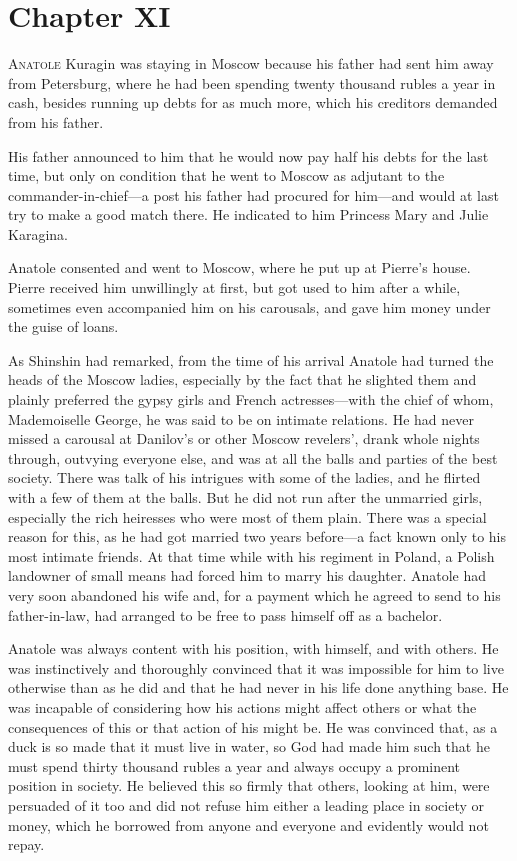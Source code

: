 \chapter*{Chapter XI}
\ifaudio     
{} 
\fi

\lettrine[lines=2, loversize=0.3, lraise=0]{\initfamily A}{natole}
Kuragin was staying in Moscow because his father had sent
him away from Petersburg, where he had been spending twenty
thousand rubles a year in cash, besides running up debts for as
much more, which his creditors demanded from his father.

His father announced to him that he would now pay half his debts
for the last time, but only on condition that he went to Moscow
as adjutant to the commander-in-chief---a post his father had
procured for him---and would at last try to make a good match
there. He indicated to him Princess Mary and Julie Karagina.

Anatole consented and went to Moscow, where he put up at Pierre's
house.  Pierre received him unwillingly at first, but got used to
him after a while, sometimes even accompanied him on his
carousals, and gave him money under the guise of loans.

As Shinshin had remarked, from the time of his arrival Anatole
had turned the heads of the Moscow ladies, especially by the fact
that he slighted them and plainly preferred the gypsy girls and
French actresses---with the chief of whom, Mademoiselle George,
he was said to be on intimate relations. He had never missed a
carousal at Danilov's or other Moscow revelers', drank whole
nights through, outvying everyone else, and was at all the balls
and parties of the best society. There was talk of his intrigues
with some of the ladies, and he flirted with a few of them at the
balls. But he did not run after the unmarried girls, especially
the rich heiresses who were most of them plain. There was a
special reason for this, as he had got married two years
before---a fact known only to his most intimate friends. At that
time while with his regiment in Poland, a Polish landowner of
small means had forced him to marry his daughter. Anatole had
very soon abandoned his wife and, for a payment which he agreed
to send to his father-in-law, had arranged to be free to pass
himself off as a bachelor.

Anatole was always content with his position, with himself, and
with others. He was instinctively and thoroughly convinced that
it was impossible for him to live otherwise than as he did and
that he had never in his life done anything base. He was
incapable of considering how his actions might affect others or
what the consequences of this or that action of his might be. He
was convinced that, as a duck is so made that it must live in
water, so God had made him such that he must spend thirty
thousand rubles a year and always occupy a prominent position in
society. He believed this so firmly that others, looking at him,
were persuaded of it too and did not refuse him either a leading
place in society or money, which he borrowed from anyone and
everyone and evidently would not repay.


